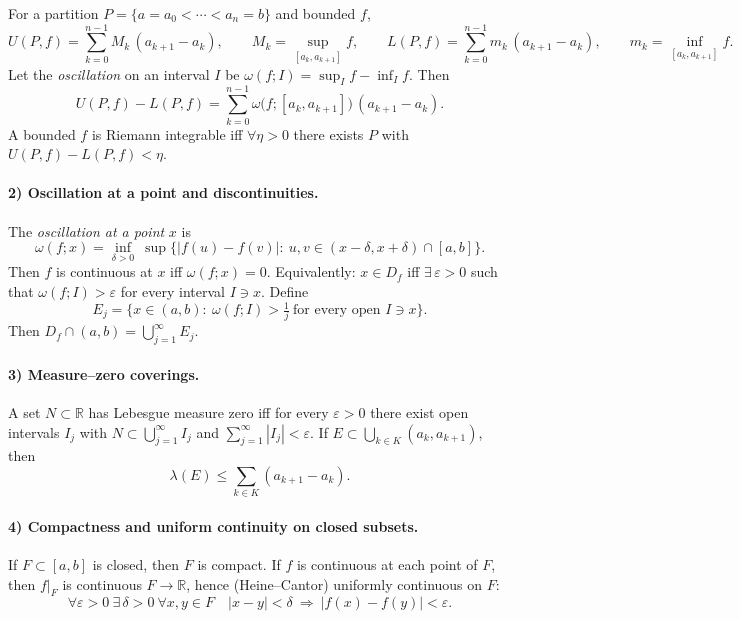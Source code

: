 \documentclass[12pt,a4paper]{article}
\theoremstyle{plain}
\theoremstyle{definition}
\theoremstyle{remark}
\theoremstyle{remark}
\begin{document}
For a partition $P=\{a=a_0<\cdots<a_n=b\}$ and bounded $f$,
\[
U(P,f)=\sum_{k=0}^{n-1} M_k\,(a_{k+1}-a_k),\qquad
M_k=\sup_{[a_k,a_{k+1}]} f,\qquad
L(P,f)=\sum_{k=0}^{n-1} m_k\,(a_{k+1}-a_k),\qquad
m_k=\inf_{[a_k,a_{k+1}]} f.
\]
Let the \emph{oscillation} on an interval $I$ be $\omega(f;I)=\sup_I f-\inf_I f$.
Then
\[
U(P,f)-L(P,f)=\sum_{k=0}^{n-1} \omega\!\big(f;[a_k,a_{k+1}]\big)\,(a_{k+1}-a_k).
\]
A bounded $f$ is Riemann integrable iff $\forall \eta>0$ there exists $P$ with $U(P,f)-L(P,f)<\eta$.

\paragraph{2) Oscillation at a point and discontinuities.}\mbox{}\par



The \emph{oscillation at a point} $x$ is
\[
\omega(f;x)=\inf_{\delta>0}\ \sup\{|f(u)-f(v)|:\ u,v\in (x-\delta,x+\delta)\cap[a,b]\}.
\]
Then $f$ is continuous at $x$ iff $\omega(f;x)=0$.
Equivalently: $x\in D_f$ iff $\exists\,\varepsilon>0$ such that $\omega(f;I)>\varepsilon$
for every interval $I\ni x$.
Define
\[
E_j=\Big\{x\in(a,b):\ \omega(f;I)>\tfrac{1}{j}\ \text{for every open }I\ni x\Big\}.
\]
Then $D_f\cap(a,b)=\bigcup_{j=1}^\infty E_j$.

\paragraph{3) Measure--zero coverings.}\mbox{}\par

A set $N\subset\mathbb{R}$ has Lebesgue measure zero iff
for every $\varepsilon>0$ there exist open intervals $I_j$ with
$N\subset \bigcup_{j=1}^\infty I_j$ and $\sum_{j=1}^\infty |I_j|<\varepsilon$.
If $E\subset \bigcup_{k\in K}(a_k,a_{k+1})$, then
\[
\lambda(E)\le \sum_{k\in K}(a_{k+1}-a_k).
\]

\paragraph{4) Compactness and uniform continuity on closed subsets.}\mbox{}\par
If $F\subset [a,b]$ is closed, then $F$ is compact.
If $f$ is continuous at each point of $F$, then $f|_F$ is continuous $F\to\mathbb{R}$,
hence (Heine--Cantor) uniformly continuous on $F$:
\[
\forall \varepsilon>0\ \exists\,\delta>0\ \forall x,y\in F\quad
|x-y|<\delta \ \Longrightarrow\ |f(x)-f(y)|<\varepsilon.
\]
\end{document}
